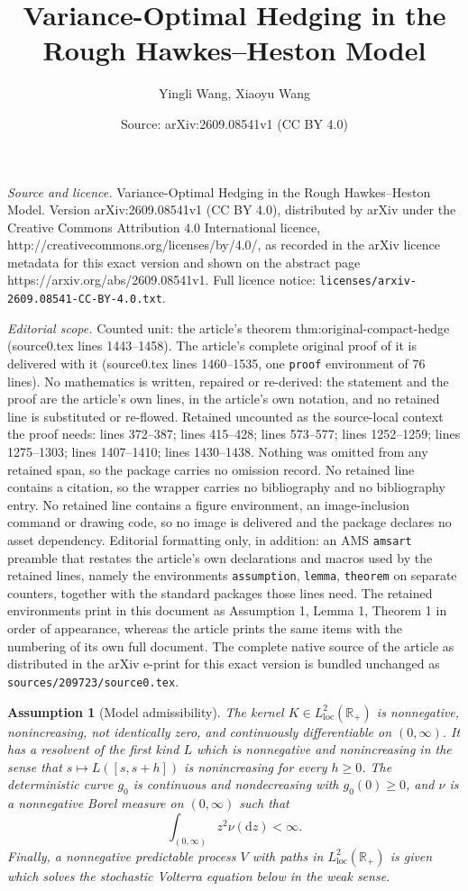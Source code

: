 \documentclass[10pt,a4paper]{amsart}
\title{Variance-Optimal Hedging in the Rough Hawkes--Heston Model}
\author{Yingli Wang, Xiaoyu Wang}
\date{Source: arXiv:2609.08541v1 (CC BY 4.0)}
\newtheorem{assumption}{Assumption}
\newcommand{\R}{\mathbb{R}}
\newcommand{\dd}{\mathrm{d}}
\begin{document}
\maketitle

\noindent\emph{Source and licence.} Variance-Optimal Hedging in the Rough Hawkes--Heston Model. Version arXiv:2609.08541v1 (CC BY 4.0), distributed by arXiv under the Creative Commons Attribution 4.0 International licence, http://creativecommons.org/licenses/by/4.0/, as recorded in the arXiv licence metadata for this exact version and shown on the abstract page https://arxiv.org/abs/2609.08541v1. Full licence notice: \texttt{licenses/arxiv-2609.08541-CC-BY-4.0.txt}.\par\smallskip

\noindent\textit{Editorial scope.} Counted unit: the article's theorem thm:original-compact-hedge (source0.tex lines 1443--1458). The article's complete original proof of it is delivered with it (source0.tex lines 1460--1535, one \texttt{proof} environment of 76 lines). No mathematics is written, repaired or re-derived: the statement and the proof are the article's own lines, in the article's own notation, and no retained line is substituted or re-flowed.  Retained uncounted as the source-local context the proof needs: lines 372--387; lines 415--428; lines 573--577; lines 1252--1259; lines 1275--1303; lines 1407--1410; lines 1430--1438.  Nothing was omitted from any retained span, so the package carries no omission record.  No retained line contains a citation, so the wrapper carries no bibliography and no bibliography entry.  No retained line contains a figure environment, an image-inclusion command or drawing code, so no image is delivered and the package declares no asset dependency.  Editorial formatting only, in addition: an AMS \texttt{amsart} preamble that restates the article's own declarations and macros used by the retained lines, namely the environments \texttt{assumption}, \texttt{lemma}, \texttt{theorem} on separate counters, together with the standard packages those lines need.  The retained environments print in this document as Assumption 1, Lemma 1, Theorem 1 in order of appearance, whereas the article prints the same items with the numbering of its own full document.  The complete native source of the article as distributed in the arXiv e-print for this exact version is bundled unchanged as \texttt{sources/209723/source0.tex}.
\begin{assumption}[Model admissibility]
\label{ass:model}
The kernel $K\in L^2_{\mathrm{loc}}(\R_+)$ is nonnegative, nonincreasing,
not identically zero, and continuously differentiable on $(0,\infty)$. It has
a resolvent of the first kind $L$ which is nonnegative and nonincreasing in
the sense that $s\mapsto L([s,s+h])$ is nonincreasing for every $h\geq0$.
The deterministic curve $g_0$ is continuous and nondecreasing with
$g_0(0)\geq0$, and $\nu$ is a nonnegative Borel measure on $(0,\infty)$ such
that
\[
 \int_{(0,\infty)}z^2\nu(\dd z)<\infty.
\]
Finally, a nonnegative predictable process $V$ with paths in
$L^2_{\mathrm{loc}}(\R_+)$ is given which solves the stochastic Volterra
equation below in the weak sense.
\end{assumption}
\end{document}
